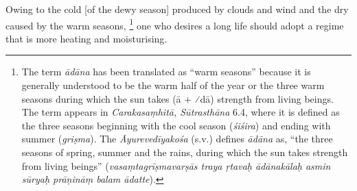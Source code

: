 \begin{translation}
	\item[34] %
	Owing to the cold [of the dewy season] produced by clouds and wind and the dry caused by the warm seasons,%
	\footnote{The term \emph{ādāna} has been translated as ``warm seasons'' because it is generally understood to be the warm half of the year or the three warm seasons during which the sun takes (ā + ⁄{dā}) strength from living beings. The term appears in \emph{Carakasaṃhitā, Sūtrasthāna} 6.4, where it is defined as the three seasons beginning with the cool season (\emph{śiśira}) and ending with summer (\emph{griṣma}). The  \emph{Āyurevedīyakośa} (s.v.) defines \emph{ādāna} as, ``the three seasons of spring, summer and the rains, during which the sun takes strength from living beings''  (\emph{vasaṃtagrīṣmavarṣās traya ṛtavaḥ ādānakālaḥ asmin sūryaḥ prāṇināṃ balam ādatte}).}
	one who desires a long life should adopt a regime that is more heating and moisturising.



\end{translation}

